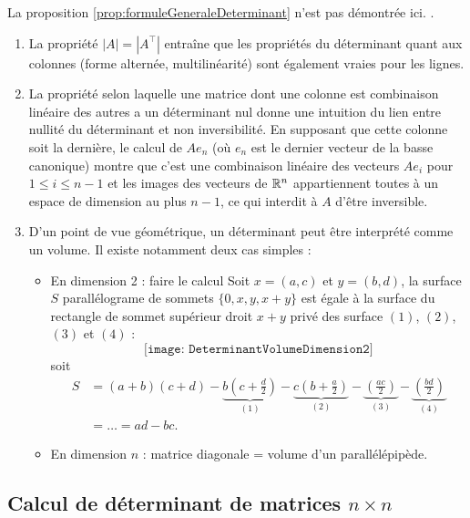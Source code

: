 La proposition \ref{prop:formuleGeneraleDeterminant} n'est pas démontrée ici. \eproof.

\remarks 
\begin{enumerate}
 \item La propriété $|A| = |A^\top|$ entraîne que les propriétés du déterminant quant aux colonnes (forme alternée, multilinéarité) sont également vraies pour les lignes. 
 \item La propriété selon laquelle une matrice dont une colonne est combinaison linéaire des autres a un déterminant nul donne une intuition du lien entre nullité du déterminant et non inversibilité. En supposant que cette colonne soit la dernière, le calcul de $A e_n$ (où $e_n$ est le dernier vecteur de la basse canonique) montre que c'est une combinaison linéaire des vecteurs $A e_i$ pour $1 \leq i \leq n-1$ et les images des vecteurs de $\mathbb{R}^n$ appartiennent toutes à un espace de dimension au plus $n-1$, ce qui interdit à $A$ d'être inversible.
  \item D'un point de vue géométrique, un déterminant peut être interprété comme un volume. Il existe notamment deux cas simples :
  \begin{itemize}
  \item En dimension 2 : faire le calcul
    Soit $x = (a, c)$ et $y = (b, d)$, la surface $S$ parallélograme de sommets $\{0, x, y, x+y\}$ est égale à la surface du rectangle de sommet supérieur droit $x+y$ privé des surface $(1)$, $(2)$, $(3)$ et $(4)$ : 
    $$
    \texttt{[image: DeterminantVolumeDimension2]}
    $$
    soit
    \begin{align*}
      S 
      & = (a+b)(c+d) 
      - \underset{(1)}{\underbrace{b\left(c + \frac{d}2\right)}} 
      - \underset{(2)}{\underbrace{c\left(b + \frac{a}2\right)}} 
      - \underset{(3)}{\underbrace{\left(\frac{ac}2\right)}} 
      - \underset{(4)}{\underbrace{\left(\frac{bd}2\right)}} \\
      & = \dots = ad - bc.
    \end{align*}
  \item En dimension $n$ : matrice diagonale = volume d'un parallélépipède.
  \end{itemize}
\end{enumerate}

\subsection{Calcul de déterminant de matrices $n \times n$} 

